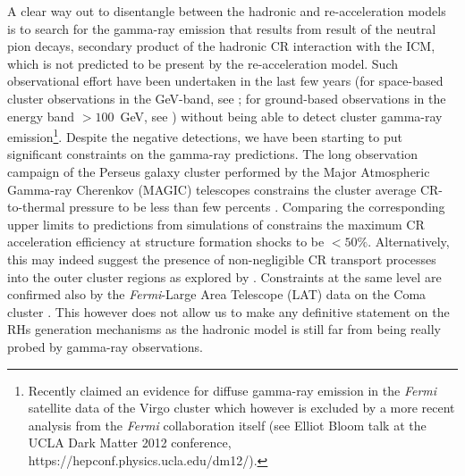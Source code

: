 \documentclass[traditabstract]{aa}
\begin{document}
A clear way out to disentangle between the hadronic and re-acceleration models is to search for the gamma-ray emission that results from
result of the neutral pion decays, secondary product of the hadronic CR interaction with the ICM, which is not predicted to be present
by the re-acceleration model. Such observational effort have been undertaken in the last few years (for space-based cluster observations in the GeV-band, 
see \citealt{2003ApJ...588..155R, 2010ApJ...717L..71A, 2010JCAP...05..025A,2012AAS...21920701Z,2012arXiv1201.1003H}; for ground-based 
observations in the energy band $>100$~GeV, see \citealt{2006ApJ...644..148P, 2008AIPC.1085..569P, 2009A&A...495...27A,2009arXiv0907.0727T, 
2009arXiv0907.3001D, 2009arXiv0907.5000G,cangaroo_clusters,2009ApJ...706L.275A,2010ApJ...710..634A,2011arXiv1111.5544M}) without being able to detect
cluster gamma-ray emission\footnote[1]{Recently \cite{2012arXiv1201.1003H} claimed an evidence for diffuse gamma-ray emission in the \emph{Fermi} satellite data of 
the Virgo cluster which however is excluded by a more recent analysis from the \emph{Fermi} collaboration itself (see Elliot Bloom talk at the UCLA Dark Matter 2012 conference, https://hepconf.physics.ucla.edu/dm12/).}.
Despite the negative detections, we have been starting to put significant constraints on the gamma-ray predictions. The long observation campaign of the Perseus 
galaxy cluster performed by the Major Atmospheric Gamma-ray Cherenkov (MAGIC) telescopes constrains the cluster average CR-to-thermal pressure to 
be less than few percents \citep{2010ApJ...710..634A,2011arXiv1111.5544M}. Comparing the corresponding upper limits to predictions from 
simulations of \cite{2010MNRAS.409..449P} constrains the maximum CR acceleration efficiency at structure formation shocks to be $<50\%$. 
Alternatively, this may indeed suggest the presence of non-negligible CR transport processes into the outer cluster regions as explored by \cite{2011A&A...527A..99E}. 
Constraints at the same level are confirmed also by the \emph{Fermi}-Large Area Telescope (LAT) data on the Coma cluster \citep{2012AAS...21920701Z,2012arXiv1201.1003H}. This however does not allow us to make any definitive statement on the RHs generation mechanisms as the hadronic model is still far from being really 
probed by gamma-ray observations.
\end{document}
